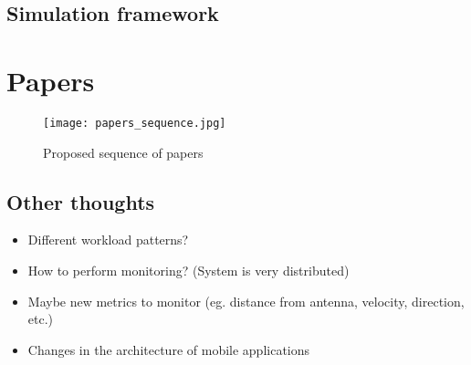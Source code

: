 \documentclass[conference]{IEEEtran}
\begin{document}
\subsection{Simulation framework}



\section{Papers}
\begin{figure}[!H]
	\centering
	\texttt{[image: papers\_sequence.jpg]} 
	\caption{Proposed sequence of papers}
	\label{fig:papers_sequence}
\end{figure}






\subsection{Other thoughts} 

\begin{itemize}
\item Different workload patterns?
\item How to perform monitoring? (System is very distributed)
\item Maybe new metrics to monitor (eg. distance from antenna, velocity, direction, etc.)
\item Changes in the architecture of mobile applications
\end{itemize}




\end{document}
